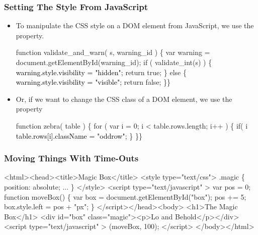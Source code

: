 \documentclass[svgnames,handout]{beamer}
\begin{document}
\begin{frame}[fragile=singleslide] 
\frametitle{Setting The Style From JavaScript}

\begin{itemize}
\item To manipulate the CSS style on a DOM element from JavaScript, we
  use the  property.
\begin{semiverbatim}
\footnotesize\color{gray}function validate_and_warn( s, warning_id ) \{
  var warning = document.getElementById(warning_id);
  if ( validate_int(s) ) \{
    \textcolor{black}{warning.style.visibility = "hidden";}
    return true;
  \} else \{
    \textcolor{black}{warning.style.visibility = "visible";}
    return false;
  \}\}
\end{semiverbatim}

\item Or, if we want to change the CSS class of a DOM element, we use
  the  property
\begin{semiverbatim}
\footnotesize\color{gray}function zebra( table ) \{
  for ( var i = 0; i < table.rows.length; i++ ) \{
    if( i %
      \textcolor{black}{table.rows[i].className = "oddrow";}
    \}
  \}\}
\end{semiverbatim}
\end{itemize}
\end{frame}


\begin{frame}[fragile=singleslide]
 \frametitle{Moving Things With Time-Outs}
 \begin{footnotesize}
\begin{semiverbatim}\color{gray}
<html><head><title>Magic Box</title>
<style type="text/css">
 .magic \{ position: absolute; ... \}
</style>
<script type="text/javascript" >
{\color{black} var pos = 0;
 function moveBox() \{
   var box = document.getElementById("box");
   pos += 5;
   box.style.left = pos + "px";
 \}}
</script></head><body>
  <h1>The Magic Box</h1>
  <div id="box" class="magic"><p>Lo and Behold</p></div>
  <script type="text/javascript" >
  {\color{black}(moveBox, 100);}
  </script>
</body></html>
\end{semiverbatim}
 \end{footnotesize}
\end{frame}
\end{document}
